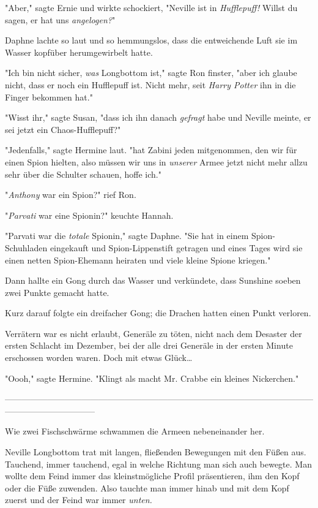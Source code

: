 {"Aber," sagte Ernie und wirkte schockiert, "Neville ist in \emph{Hufflepuff!} Willst du sagen, er hat uns \emph{angelogen?}"

Daphne lachte so laut und so hemmungslos, dass die entweichende Luft sie im Wasser kopfüber herumgewirbelt hatte.

"Ich bin nicht sicher, \emph{was} Longbottom ist," sagte Ron finster, "aber ich glaube nicht, dass er noch ein Hufflepuff ist. Nicht mehr, seit \emph{Harry Potter} ihn in die Finger bekommen hat."

"Wisst ihr," sagte Susan, "dass ich ihn danach \emph{gefragt} habe und Neville meinte, er sei jetzt ein Chaos-Hufflepuff?"

"Jedenfalls," sagte Hermine laut. "hat Zabini jeden mitgenommen, den wir für einen Spion hielten, also müssen wir uns in \emph{unserer} Armee jetzt nicht mehr allzu sehr über die Schulter schauen, hoffe ich."

"\emph{Anthony} war ein Spion?" rief Ron.

"\emph{Parvati} war eine Spionin?" keuchte Hannah.

"Parvati war die \emph{totale} Spionin," sagte Daphne. "Sie hat in einem Spion-Schuhladen eingekauft und Spion-Lippenstift getragen und eines Tages wird sie einen netten Spion-Ehemann heiraten und viele kleine Spione kriegen."

Dann hallte ein Gong durch das Wasser und verkündete, dass Sunshine soeben zwei Punkte gemacht hatte.

Kurz darauf folgte ein dreifacher Gong; die Drachen hatten einen Punkt verloren.

Verrätern war es nicht erlaubt, Generäle zu töten, nicht nach dem Desaster der ersten Schlacht im Dezember, bei der alle drei Generäle in der ersten Minute erschossen worden waren. Doch mit etwas Glück…

"Oooh," sagte Hermine. "Klingt als macht Mr. Crabbe ein kleines Nickerchen."

--------------------------------------------------------------------------------------------------------------------------------------------

Wie zwei Fischschwärme schwammen die Armeen nebeneinander her.

Neville Longbottom trat mit langen, fließenden Bewegungen mit den Füßen aus. Tauchend, immer tauchend, egal in welche Richtung man sich auch bewegte. Man wollte dem Feind immer das kleinstmögliche Profil präsentieren, ihm den Kopf oder die Füße zuwenden. Also tauchte man immer hinab und mit dem Kopf zuerst und der Feind war immer \emph{unten.}

}
